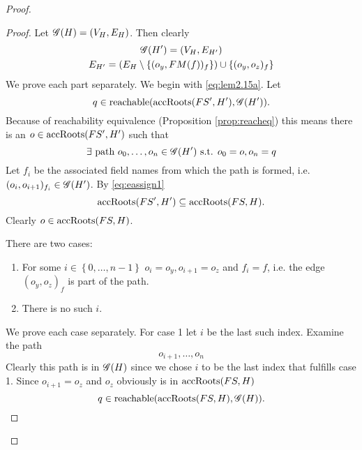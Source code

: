 \begin{proof}
\begin{description}
\begin{description}
\begin{description}
              \begin{proof}
                Let $\mathscr{G}(H) = (V_H, E_H)$. Then clearly
                \begin{equation}
                  \begin{gathered}
                    \mathscr{G}(H') = (V_H, E_{H'}) \\
                    E_{H'} = (E_H \setminus \{(o_y, FM(f))_f \}) \cup \{(o_y,
                    o_z)_f \}
                  \end{gathered}
                \end{equation}
                We prove each part separately.  We begin with
                \eqref{eq:lem2.15a}.  Let
                \begin{equation*}
                  q \in \mbox{$\mathrm{reachable}$}(\mbox{$\mathrm{accRoots}$}(FS', H'), \mathscr{G}(H')).
                \end{equation*}
                Because of reachability equivalence (Proposition
                \ref{prop:reacheq}) this means there is an $o \in \mbox{$\mathrm{accRoots}$}(FS',
                H')$ such that
                \begin{equation}
                  \exists \text{ path } o_0, \dots, o_n \in \mathscr{G}(H')
                  \text{ s.t. } o_0 = o, o_n = q
                \end{equation}
                Let $f_i$ be the associated field names from which the path is
                formed, i.e. $(o_i, o_{i+1})_{f_i} \in \mathscr{G}(H')$.
                By \eqref{eq:eassign1}
                \begin{equation}
                  \mbox{$\mathrm{accRoots}$}(FS', H') \subseteq \mbox{$\mathrm{accRoots}$}(FS, H).
                \end{equation}
                Clearly $o \in \mbox{$\mathrm{accRoots}$}(FS, H)$.

                There are two cases:
                \begin{enumerate}
                  \item For some $i \in \left\{ 0, \dots, n-1 \right\}$ $o_i =
                    o_y, o_{i+1} = o_z$ and $f_i = f$, i.e. the edge $(o_y,
                    o_z)_{f}$ is part of the path.
                  \item There is no such $i$.
                \end{enumerate}
                We prove each case separately. For case 1 let $i$ be the last
                such index. Examine the path 
                \begin{equation}
                  o_{i+1}, \dots, o_n
                \end{equation}
                Clearly this path is in $\mathscr{G}(H)$ since we chose $i$ to be the
                last index that fulfills case 1.  Since $o_{i+1} = o_z$ and
                $o_z$ obviously is in $\mbox{$\mathrm{accRoots}$}(FS, H)$
                \begin{equation}
                  q \in \mbox{$\mathrm{reachable}$}(\mbox{$\mathrm{accRoots}$}(FS, H), \mathscr{G}(H)).
                \end{equation}


\end{proof}
\end{description}
\end{description}
\end{description}
\end{proof}
